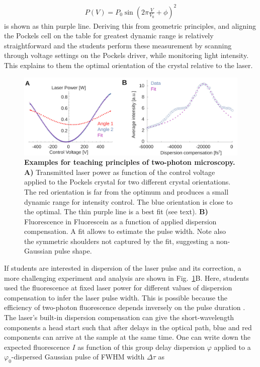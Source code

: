 \documentclass[10pt,letterpaper]{article}
\begin{document}
\begin{eqnarray}
    P(V) = P_0 \sin\left(2\pi\frac{V}{V_0} + \phi \right)^2
\end{eqnarray}
is shown as thin purple line. Deriving this from geometric principles, and aligning the Pockels cell on the table for greatest dynamic range is relatively straightforward and the students perform these measurement by scanning through voltage settings on the Pockels driver, while monitoring light intensity. This explains to them the optimal orientation of the crystal relative to the laser.\newline
%
\begin{figure}[!t]
    \includegraphics[width=\textwidth]{fig9.jpg}
    \caption{{\bf Examples for teaching principles of two-photon microscopy.} \textbf{A)} Transmitted laser power as function of the control voltage applied to the Pockels crystal for two different crystal orientations. The red orientation is far from the optimum and produces a small dynamic range for intensity control. The blue orientation is close to the optimal. The thin purple line is a best fit (see text). \textbf{B)} Fluorescence in Fluorescein as a function of applied dispersion compensation. A fit allows to estimate the pulse width. Note also the symmetric shoulders not captured by the fit, suggesting a non-Gaussian pulse shape.}
    \label{fig9}
\end{figure}
%
If students are interested in dispersion of the laser pulse and its correction, a more challenging experiment and analysis are shown in Fig.~\ref{fig9}B. Here, students used the fluorescence at fixed laser power for different values of dispersion compensation to infer the laser pulse width. This is possible because the efficiency of two-photon fluorescence depends inversely on the pulse duration \cite{Denk1990, Zipfel2003}. The laser's built-in dispersion compensation can give the short-wavelength components a head start such that after delays in the optical path, blue and red components can arrive at the sample at the same time. One can write down the expected fluorescence $I$ as function of this group delay dispersion $\varphi$ applied to a $\varphi_0$-dispersed Gaussian pulse of FWHM width $\Delta\tau$ as
\end{document}
